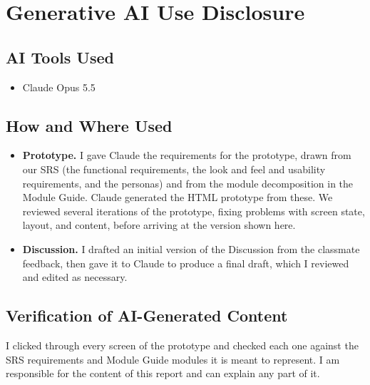 \documentclass{article}
\begin{document}
\section{Generative AI Use Disclosure}

\subsection{AI Tools Used}

\begin{itemize}
  \item Claude Opus 5.5
\end{itemize}

\subsection{How and Where Used}

\begin{itemize}
  \item \textbf{Prototype.} I gave Claude the requirements for the prototype,
  drawn from our SRS (the functional requirements, the look and feel and
  usability requirements, and the personas) and from the module decomposition
  in the Module Guide. Claude generated the HTML prototype from these. We
  reviewed several iterations of the prototype, fixing problems with screen
  state, layout, and content, before arriving at the version shown here.
  \item \textbf{Discussion.} I drafted an initial version of the Discussion
  from the classmate feedback, then gave it to Claude to produce a final draft,
  which I reviewed and edited as necessary.
\end{itemize}

\subsection{Verification of AI-Generated Content}

I clicked through every screen of the prototype and checked each one against
the SRS requirements and Module Guide modules it is meant to represent. I am
responsible for the content of this report and can explain any part of it.
\end{document}
